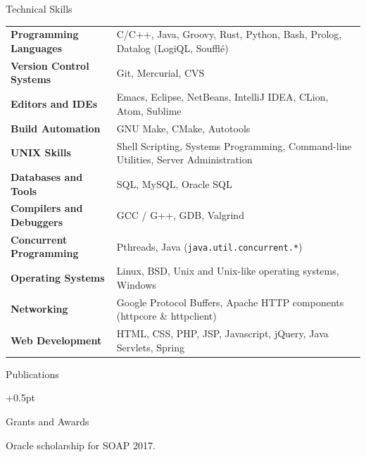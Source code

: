 \documentclass{resume}
\begin{document}
\begin{rSection}{Technical Skills}

{\renewcommand{\arraystretch}{1.3}
\begin{tabular}{ @{} >{\bfseries}l @{\hspace{6ex}} l }

Programming Languages
   & C/C++, Java, Groovy, Rust, Python, Bash, Prolog, Datalog (LogiQL, Souffl\'e) \\

Version Control Systems
   & Git, Mercurial, CVS \\

Editors and IDEs
   & Emacs, Eclipse, NetBeans, IntelliJ IDEA, CLion, Atom, Sublime \\

Build Automation
   & GNU Make, CMake, Autotools \\

UNIX Skills
   & Shell Scripting, Systems Programming, Command-line Utilities, Server Administration \\

Databases and Tools
   & SQL, MySQL, Oracle SQL \\

Compilers and Debuggers
   & GCC / G++, GDB, Valgrind \\

Concurrent Programming
   & Pthreads, Java (\texttt{java.util.concurrent.*}) \\

Operating Systems
   & Linux, BSD, Unix and Unix-like operating systems, Windows \\

Networking
   & Google Protocol Buffers, Apache HTTP components (httpcore \& httpclient) \\

Web Development
   & HTML, CSS, PHP, JSP, Javascript, jQuery, Java Servlets, Spring \\

\end{tabular}}
\end{rSection}


\begin{rSection}{Publications}
  \begin{rSubsection}{}{}{}{}
    \itemsep +0.5pt %
  \item {}
  \end{rSubsection}
\end{rSection}

\begin{rSection}{Grants and Awards}
  \begin{rSubsection}{}{}{}{}
  \item Oracle scholarship for SOAP 2017.
  \end{rSubsection}
\end{rSection}
\end{document}
